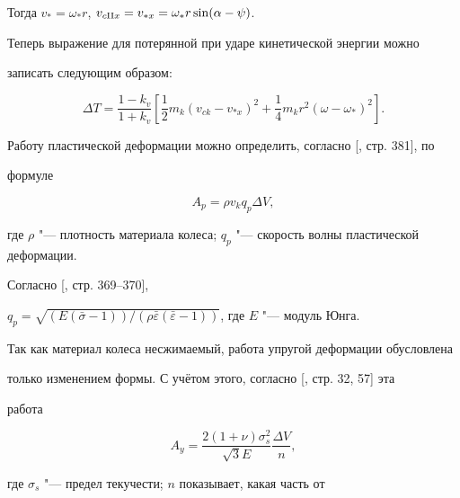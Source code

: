 Тогда $v_\ast = \omega_\ast r$, $v_{c{\rm II}x} = v_{\ast x} = \omega_\ast r\sin (\alpha -\psi)$.

Теперь выражение для потерянной при ударе кинетической энергии можно

записать следующим образом:

\begin{equation}

\label{kudurov10:eq24}

\Delta T = \frac{1-k_v}{1 + k_v} \left[ \frac12 m_k \left( v_{ck} - v_{\ast x}

\right)^2 + \frac14 m_k r^2\left( \omega -\omega_\ast \right)^2 \right].

\end{equation}



Работу пластической деформации можно определить, согласно [, стр. 381], по

формуле

\begin{equation}

\label{kudurov10:eq25}

A_p = \rho v_k q_p \Delta V,

\end{equation}

где $\rho $ "--- плотность материала колеса; $q_p$ "--- скорость волны пластической деформации. 

Согласно [, стр. 369--370], 

$q_p = \sqrt {({E\left( \bar {\sigma}-1 \right)})/({\rho \bar {\varepsilon }\left( \bar {\varepsilon}-1 \right)} )}$, где $E$ "--- модуль Юнга.



Так как материал колеса несжимаемый, работа упругой деформации обусловлена

только изменением формы. С учётом этого, согласно [, стр. 32, 57] эта

работа 

\begin{equation}

\label{kudurov10:eq26}

A_y =\frac{2 ( 1+\nu ) \sigma_s^2}{\sqrt 3 E}\frac{\Delta V}{n},

\end{equation}

где $\sigma_s$ "--- предел текучести; $n$ показывает, какая часть от

